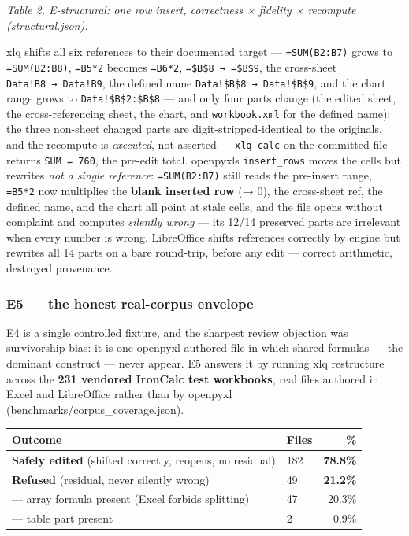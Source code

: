 \documentclass[
]{article}
\newcounter{none} %
\begin{document}
\emph{Table 2. E-structural: one row insert, correctness × fidelity ×
recompute (structural.json).}

xlq shifts all six references to their documented target ---
\texttt{=SUM(B2:B7)} grows to \texttt{=SUM(B2:B8)}, \texttt{=B5*2}
becomes \texttt{=B6*2}, \texttt{=\$B\$8\ →\ =\$B\$9}, the cross-sheet
\texttt{Data!B8\ →\ Data!B9}, the defined name
\texttt{Data!\$B\$8\ →\ Data!\$B\$9}, and the chart range grows to
\texttt{Data!\$B\$2:\$B\$8} --- and only four parts change (the edited
sheet, the cross-referencing sheet, the chart, and \texttt{workbook.xml}
for the defined name); the three non-sheet changed parts are
digit-stripped-identical to the originals, and the recompute is
\emph{executed}, not asserted --- \texttt{xlq\ calc} on the committed
file returns \texttt{SUM\ =\ 760}, the pre-edit total.
openpyxl\textquotesingle s \texttt{insert\_rows} moves the cells but
rewrites \emph{not a single reference}: \texttt{=SUM(B2:B7)} still reads
the pre-insert range, \texttt{=B5*2} now multiplies the \textbf{blank
inserted row} (→ 0), the cross-sheet ref, the defined name, and the
chart all point at stale cells, and the file opens without complaint and
computes \emph{silently wrong} --- its 12/14 preserved parts are
irrelevant when every number is wrong. LibreOffice shifts references
correctly by engine but rewrites all 14 parts on a bare round-trip,
before any edit --- correct arithmetic, destroyed provenance.

\subsubsection{E5 --- the honest real-corpus
envelope}\label{e5--the-honest-real-corpus-envelope}

E4 is a single controlled fixture, and the sharpest review objection was
survivorship bias: it is one openpyxl-authored file in which shared
formulas --- the dominant construct --- never appear. E5 answers it by
running xlq restructure across the \textbf{231 vendored IronCalc test
workbooks}, real files authored in Excel and LibreOffice rather than by
openpyxl (benchmarks/corpus\_coverage.json).

{\def\LTcaptype{none} %
\begin{longtable}[]{@{}llr@{}}
\toprule\noalign{}
Outcome & Files & \% \\
\midrule\noalign{}
\endhead
\bottomrule\noalign{}
\endlastfoot
\textbf{Safely edited} (shifted correctly, reopens, no residual) & 182 &
\textbf{78.8\%} \\
\textbf{Refused} (residual, never silently wrong) & 49 &
\textbf{21.2\%} \\
--- array formula present (Excel forbids splitting) & 47 & 20.3\% \\
--- table part present & 2 & 0.9\% \\
\end{longtable}
}
\end{document}
